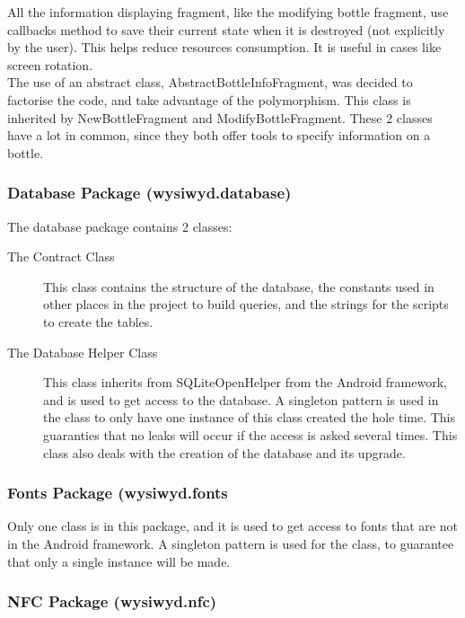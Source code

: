 All the information displaying fragment, like the modifying bottle fragment, use callbacks method to save their current state when it is destroyed (not explicitly by the user). This helps reduce resources consumption. It is useful in cases like screen rotation.\\

The use of an abstract class, AbstractBottleInfoFragment, was decided to factorise the code, and take advantage of the polymorphism. This class is inherited by NewBottleFragment and ModifyBottleFragment. These 2 classes have a lot in common, since they both offer tools to specify information on a bottle.

\subsubsection{Database Package (wysiwyd.database)}

The database package contains 2 classes:

\begin{description}
\item[The Contract Class] This class contains the structure of the database, the constants used in other places in the project to build queries, and the strings for the scripts to create the tables.

\item[The Database Helper Class] This class inherits from SQLiteOpenHelper from the Android framework, and is used to get access to the database. A singleton pattern is used in the class to only have one instance of this class created the hole time. This guaranties that no leaks will occur if the access is asked several times. This class also deals with the creation of the database and its upgrade.
\end{description}

\subsubsection{Fonts Package (wysiwyd.fonts}

Only one class is in this package, and it is used to get access to fonts that are not in the Android framework. A singleton pattern is used for the class, to guarantee that only a single instance will be made.

\subsubsection{NFC Package (wysiwyd.nfc)}

